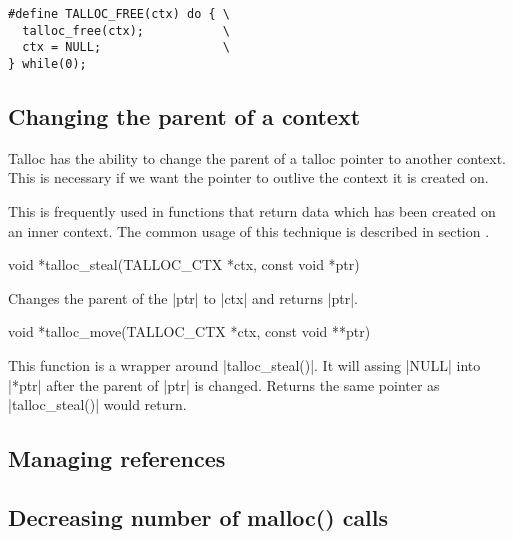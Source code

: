 \begin{lstlisting}[caption={TALLOC_FREE(ctx)},label=lst:TALLOC_FREE]
#define TALLOC_FREE(ctx) do { \
  talloc_free(ctx);           \
  ctx = NULL;                 \
} while(0);
\end{lstlisting}



\subsection{Changing the parent of a context}
\label{talloc:subsec:stealing}

Talloc has the ability to change the parent of a talloc pointer to another
context. This is necessary if we want the pointer to outlive the context it is
created on.

This is frequently used in functions that return data which has been created on
an inner context. The common usage of this technique is described in section
.

\begin{funcproto}
void *talloc_steal(TALLOC_CTX *ctx, const void *ptr)
\end{funcproto}
\begin{funcdesc}
  Changes the parent of the |ptr| to |ctx| and returns |ptr|.
\end{funcdesc}
\begin{funcproto}
void *talloc_move(TALLOC_CTX *ctx, const void **ptr)
\end{funcproto}
\begin{funcdesc}
  This function is a wrapper around |talloc_steal()|. It will assing |NULL| into
  |*ptr| after the parent of |ptr| is changed. Returns the same pointer as
  |talloc_steal()| would return.
\end{funcdesc}


\subsection{Managing references}
\label{talloc:subsec:references}

\subsection{Decreasing number of malloc() calls}
\label{talloc:subsec:pool}

